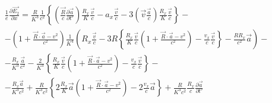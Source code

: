 \documentclass[11pt]{article}
\begin{document}
\[\begin{align}
  & \frac{1}{e}\frac{\partial \overrightarrow{{{E}_{2}}}}{\partial x}=\frac{R}{{{K}^{3}}}\frac{1}{{{c}^{2}}}\left\{ \left( \frac{\overrightarrow{R}}{c}\frac{\partial \overrightarrow{a}}{\partial t'} \right)\frac{{{R}_{x}}}{K}\frac{\overrightarrow{v}}{c}-{{a}_{x}}\frac{\overrightarrow{v}}{c}-3\left( \overrightarrow{v}\frac{\overrightarrow{a}}{c} \right)\frac{{{R}_{x}}}{K}\frac{\overrightarrow{v}}{c} \right\}- \\
 & -\left( 1+\frac{\overrightarrow{R}\cdot \overrightarrow{a}-{{v}^{2}}}{{{c}^{2}}} \right)\frac{1}{{{K}^{4}}}\left( {{R}_{x}}\frac{\overrightarrow{v}}{c}-3R\left\{ \frac{{{R}_{x}}}{K}\frac{\overrightarrow{v}}{c}\left( 1+\frac{\overrightarrow{R}\cdot \overrightarrow{a}-{{v}^{2}}}{{{c}^{2}}} \right)-\frac{{{v}_{x}}}{c}\frac{\overrightarrow{v}}{c} \right\}-\frac{R{{R}_{x}}}{{{c}^{2}}}\overrightarrow{a} \right)- \\
 & -\frac{{{R}_{x}}}{{{K}^{3}}}\frac{\overrightarrow{a}}{{{c}^{2}}}-\frac{2}{{{K}^{3}}}\left\{ \frac{{{R}_{x}}}{K}\frac{\overrightarrow{v}}{c}\left( 1+\frac{\overrightarrow{R}\cdot \overrightarrow{a}-{{v}^{2}}}{{{c}^{2}}} \right)-\frac{{{v}_{x}}}{c}\frac{\overrightarrow{v}}{c} \right\}- \\
 & -\frac{{{R}_{x}}\overrightarrow{a}}{{{K}^{3}}{{c}^{2}}}+\frac{R}{{{K}^{3}}{{c}^{2}}}\left\{ 2\frac{{{R}_{x}}}{K}\overrightarrow{a}\left( 1+\frac{\overrightarrow{R}\cdot \overrightarrow{a}-{{v}^{2}}}{{{c}^{2}}} \right)-2\frac{{{v}_{x}}}{c}\overrightarrow{a} \right\}+\frac{R}{{{K}^{3}}{{c}^{2}}}\frac{{{R}_{x}}}{c}\frac{\partial \overrightarrow{a}}{\partial t'} \\
\end{align}\]
\end{document}
